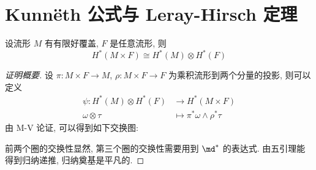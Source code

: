     \newpage

    \section{Kunn\"{e}th 公式与 Leray-Hirsch 定理}
    \begin{theorem}[Kunn\"{e}th 公式]
        设流形 $M$ 有有限好覆盖, $F$ 是任意流形, 则
        \begin{equation*}
            H^*(M\times F)\cong H^*(M)\otimes H^*(F)
        \end{equation*}
    \end{theorem}

    \begin{proof}[证明概要]
        设 $\pi:M\times F\rightarrow M$, $\rho:M\times F\rightarrow F$ 
        为乘积流形到两个分量的投影, 则可以定义
        \begin{align*}
            \psi:H^*(M)\otimes H^*(F)&\rightarrow H^*(M\times F) \\
            \omega\otimes\tau&\mapsto\pi^*\omega\wedge\rho^*\tau
        \end{align*}
        由 M-V 论证, 可以得到如下交换图:


        前两个圈的交换性显然, 第三个圈的交换性需要用到 $\md^*$ 的表达式. 
        由五引理能得到归纳递推, 归纳奠基是平凡的.
    \end{proof}

